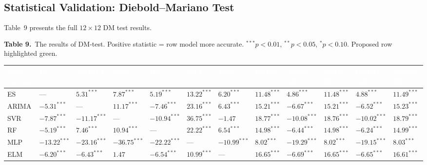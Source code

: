 \documentclass[12pt,a4paper]{article}
\newcommand{\hdrrow}[1]{\textcolor{white}{\textbf{#1}}}
\begin{document}
\subsection{Statistical Validation: Diebold--Mariano Test}

Table~9 presents the full $12\times12$ DM test results.

\vspace{4pt}
\noindent\textbf{Table 9.}~The results of DM-test. Positive statistic = row model more
accurate. $^{***}p<0.01$, $^{**}p<0.05$, $^*p<0.10$. Proposed row highlighted green.
\vspace{3pt}

\renewcommand{\arraystretch}{1.15}

\noindent\scriptsize\setlength{\tabcolsep}{3pt}
\begin{tabular}{L{2.1cm} C{1.1cm} C{1.1cm} C{1.1cm} C{1.1cm} C{1.1cm} C{1.1cm}
                C{1.1cm} C{1.3cm} C{1.3cm} C{1.5cm} C{1.5cm}}
\hdrrow{Row vs Col.} & \hdrrow{ES} & \hdrrow{ARIMA} & \hdrrow{SVR} & \hdrrow{RF} & \hdrrow{MLP} & \hdrrow{ELM} & \hdrrow{LSTM} & \hdrrow{VMD-AR} & \hdrrow{VMD-LS} & \hdrrow{CEEM-AR} & \hdrrow{CEEM-LS} \\
\hline
ES            & ---             & $5.31^{***}$    & $7.87^{***}$    & $5.19^{***}$    & $13.22^{***}$   & $6.20^{***}$    & $11.48^{***}$   & $4.86^{***}$    & $11.48^{***}$   & $4.88^{***}$    & $11.49^{***}$ \\
ARIMA         & $-5.31^{***}$   & ---             & $11.17^{***}$   & $-7.46^{***}$   & $23.16^{***}$   & $6.43^{***}$    & $15.21^{***}$   & $-6.67^{***}$   & $15.21^{***}$   & $-6.52^{***}$   & $15.23^{***}$ \\
SVR           & $-7.87^{***}$   & $-11.17^{***}$  & ---             & $-10.94^{***}$  & $36.75^{***}$   & $-1.47$         & $18.77^{***}$   & $-10.08^{***}$  & $18.76^{***}$   & $-10.02^{***}$  & $18.79^{***}$ \\
RF            & $-5.19^{***}$   & $7.46^{***}$    & $10.94^{***}$   & ---             & $22.22^{***}$   & $6.54^{***}$    & $14.98^{***}$   & $-6.44^{***}$   & $14.98^{***}$   & $-6.24^{***}$   & $14.99^{***}$ \\
MLP           & $-13.22^{***}$  & $-23.16^{***}$  & $-36.75^{***}$  & $-22.22^{***}$  & ---             & $-10.99^{***}$  & $8.02^{***}$    & $-19.29^{***}$  & $8.02^{***}$    & $-19.15^{***}$  & $8.03^{***}$  \\
ELM           & $-6.20^{***}$   & $-6.43^{***}$   & $1.47$          & $-6.54^{***}$   & $10.99^{***}$   & ---             & $16.65^{***}$   & $-6.69^{***}$   & $16.65^{***}$   & $-6.65^{***}$   & $16.61^{***}$ \\

\end{tabular}
\end{document}

